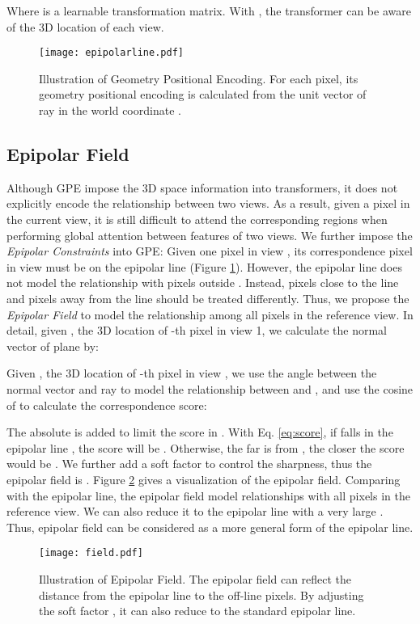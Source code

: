 \documentclass{bmvc2k}
\begin{document}
Where  is a learnable transformation matrix. With , the transformer can be aware of the 3D location of each view.  


\vspace{-0.5em}
\begin{figure}[!ht]
    \centering
    \texttt{[image: epipolarline.pdf]}
    \vspace{-1 em}
    \caption{ \footnotesize{Illustration of Geometry Positional Encoding. For each pixel, its geometry positional encoding is calculated from the unit vector  of ray  in the world coordinate .}}  
    \label{fig:epipolar}
\end{figure}


\vspace{-1.0em}
\subsection{Epipolar Field} 
\vspace{-0.5em}
Although GPE impose the 3D space information into transformers, it does not explicitly encode the relationship between two views. 
As a result, given a pixel in the current view, it is still difficult to attend the corresponding regions when performing global attention between features of two views.  
We further impose the \textit{Epipolar Constraints} \cite{andrew2001multiple} into GPE: Given one pixel  in view , its correspondence pixel  in view  must be on the epipolar line   (Figure \ref{fig:epipolar}). 
However, the epipolar line does not model the relationship with pixels outside . Instead, pixels close to the line and pixels away from the line should be treated differently. Thus, we propose the \textit{Epipolar Field} to model the relationship among all pixels in the reference view. In detail, given , the 3D location of -th pixel  in view 1, we calculate  the normal vector  of plane  by: 

Given , the 3D location of -th pixel  in view , we use the angle  between the normal vector  and ray   to model the relationship between  and , and use the cosine of  to calculate the correspondence score: 

The absolute  is added to limit the score in . 
With Eq. \ref{eq:score}, if  falls in the epipolar line , the score  will be . Otherwise, the far  is from , the closer the score would be . We further add a soft factor  to control the sharpness, thus the  epipolar field is . 
Figure \ref{fig:epipolar_example} gives a visualization of the epipolar field. Comparing with the epipolar line, the epipolar field model relationships with all pixels in the reference view. We can also reduce it to the epipolar line with a very large . Thus, epipolar field can be considered as a more general form of the epipolar line.  
\begin{figure}[!ht]
    \centering
    \texttt{[image: field.pdf]}
    \vspace{-1 em}
    \caption{ \footnotesize{Illustration of Epipolar Field. The epipolar field can reflect the distance from the epipolar line to the off-line pixels. By adjusting the soft factor , it can also reduce to the standard epipolar line.}  }
    \label{fig:epipolar_example}
\end{figure}
\end{document}

